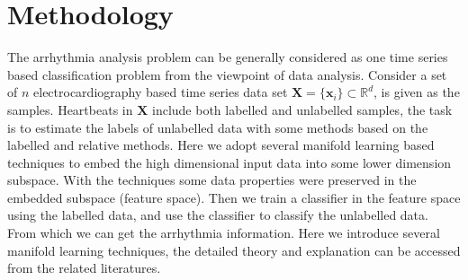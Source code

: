 \documentclass[journal]{IEEEtran}
\begin{document}
%
%

\section{Methodology}
The arrhythmia analysis problem can be generally considered as one time series based classification problem from the viewpoint of data analysis.
Consider a set of $n$ electrocardiography based time series data set $\boldsymbol{X} = \{\boldsymbol{x}_i\} \subset \mathbb{R}^d$, is given as the samples.
Heartbeats in $\boldsymbol{X}$ include both labelled and unlabelled samples, the task is to estimate the labels of unlabelled data with some methods based on the labelled and relative methods.
Here we adopt several manifold learning based techniques to embed the high dimensional input data into some lower dimension subspace. 
With the techniques some data properties were preserved in the embedded subspace (feature space).
Then we train a classifier in the feature space using the labelled data, and use the classifier to classify the unlabelled data. From which we can get the arrhythmia information. 
Here we introduce several manifold learning techniques, the detailed theory and explanation can be accessed from the related literatures.
\end{document}
